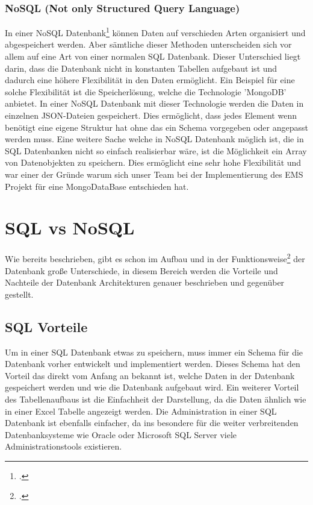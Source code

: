 	\subsubsection{NoSQL (Not only Structured Query Language)}	
	In einer NoSQL Datenbank\footcite{mongodb} können Daten auf verschieden Arten organisiert und abgespeichert werden. Aber sämtliche dieser Methoden unterscheiden sich vor allem auf eine Art von einer normalen SQL Datenbank. 
	Dieser Unterschied liegt darin, dass die Datenbank nicht in konstanten Tabellen aufgebaut ist und dadurch eine höhere Flexibilität in den Daten ermöglicht. 
	Ein Beispiel für eine solche Flexibilität ist die Speicherlösung, welche die Technologie 'MongoDB' anbietet. In einer NoSQL Datenbank mit dieser Technologie werden die Daten in einzelnen JSON-Dateien gespeichert. 
	Dies ermöglicht, dass jedes Element wenn benötigt eine eigene Struktur hat ohne das ein Schema vorgegeben oder angepasst werden muss. 
	Eine weitere Sache welche in NoSQL Datenbank möglich ist, die in SQL Datenbanken nicht so einfach realisierbar wäre, ist die Möglichkeit ein Array von Datenobjekten zu speichern. 
	Dies ermöglicht eine sehr hohe Flexibilität und war einer der Gründe warum sich unser Team bei der Implementierung des EMS Projekt für eine MongoDataBase entschieden hat.
	\section{SQL vs NoSQL} 
		Wie bereits beschrieben, gibt es schon im Aufbau und in der Funktionsweise\footcite{sqlvsnosql} der Datenbank große Unterschiede, in diesem Bereich werden die Vorteile und Nachteile der Datenbank Architekturen genauer beschrieben und gegenüber gestellt.
	\subsection{SQL Vorteile}
		Um in einer SQL Datenbank etwas zu speichern, muss immer ein Schema für die Datenbank vorher entwickelt und implementiert werden. 
		Dieses Schema hat den Vorteil das direkt vom Anfang an bekannt ist, welche Daten in der Datenbank gespeichert werden und wie die Datenbank aufgebaut wird. 
		Ein weiterer Vorteil des Tabellenaufbaus ist die Einfachheit der Darstellung, da die Daten ähnlich wie in einer Excel Tabelle angezeigt werden. 
		Die Administration in einer SQL Datenbank ist ebenfalls einfacher, da ins besondere für die weiter verbreitenden Datenbanksysteme wie Oracle oder Microsoft SQL Server viele Administrationstools existieren.
